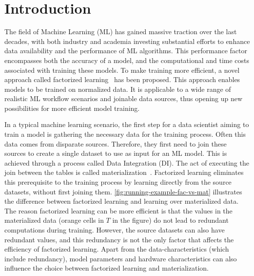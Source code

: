 
\chapter{Introduction}
\label{chapter:introduction}

The field of Machine Learning (ML) has gained massive traction over the last decades, with both industry and academia investing substantial efforts to enhance data availability and the performance of ML algorithms. This performance factor encompasses both the accuracy of a model, and the computational and time costs associated with training these models.  To make training more efficient, a novel approach called factorized learning~\cite{orion_learning_gen_lin_models} has been proposed. This approach enables models to be trained on normalized data. It is applicable to a wide range of realistic ML workflow scenarios and joinable data sources, thus opening up new possibilities for more efficient model training.

In a typical machine learning scenario, the first step for a data scientist aiming to train a model is gathering the necessary data for the training process. Often this data comes from disparate sources. Therefore, they first need to join these sources to create a single dataset to use as input for an ML model. This is achieved through a process called Data Integration (DI). The act of executing the join between the tables is called materialization~\cite{rel_db_glossary}. Factorized learning eliminates this prerequisite to the training process by learning directly from the source datasets, without first joining them. \autoref{fig:running-example-fac-vs-mat} illustrates the difference between factorized learning and learning over materialized data. The reason factorized learning can be more efficient is that the values in the materialized data (orange cells in $T$ in the figure) do not lead to redundant computations during training. However, the source datasets can also have redundant values, and this redundancy is not the only factor that affects the efficiency of factorized learning. Apart from the data-characteristics (which include redundancy), model parameters and hardware characteristics can also influence the choice between factorized learning and materialization.


